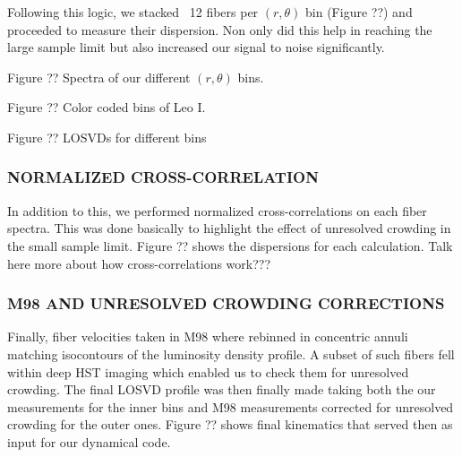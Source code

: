 \documentclass[%
 aip,
 twocolumn,
 jmp,%
 amsmath,amssymb,
 reprint,%
]{aastex61}
\begin{document}
Following this logic, we stacked ~12 fibers per $(r,\theta)$ bin (Figure ??) and proceeded to measure their dispersion. Non only did this help in reaching the large sample limit but also increased our signal to noise significantly.

Figure ?? Spectra of our different $(r,\theta)$ bins.

Figure ?? Color coded bins of Leo I.

Figure ?? LOSVDs for different bins

\subsubsection{NORMALIZED CROSS-CORRELATION}

In addition to this, we performed normalized cross-correlations on each fiber spectra. This was done basically to highlight the effect of unresolved crowding in the small sample limit. Figure ?? shows the dispersions for each calculation. Talk here more about how cross-correlations work???

\subsubsection{M98 AND UNRESOLVED CROWDING CORRECTIONS}

Finally, fiber velocities taken in M98 where rebinned in concentric annuli matching isocontours of the luminosity density profile. A subset of such fibers fell within deep HST imaging which enabled us to check them for unresolved crowding. 
The final LOSVD profile was then finally made taking both the our measurements for the inner bins and M98 measurements corrected for unresolved crowding for the outer ones. Figure ?? shows final kinematics that served then as input for our dynamical code.



\end{document}
